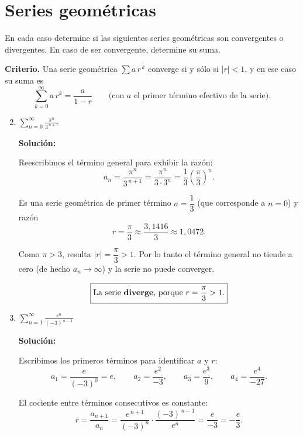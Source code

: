\documentclass[12pt]{article}
\newcommand{\solucion}{%
    \vspace{0.8em}%
    \textbf{Solución:}%
}
\begin{document}

\section{Series geométricas}

En cada caso determine si las siguientes series geométricas son convergentes o
divergentes. En caso de ser convergente, determine su suma.

\vspace{0.5em}
\textbf{Criterio.} Una serie geométrica $\sum a\,r^{\,k}$ converge si y sólo si
$|r|<1$, y en ese caso su suma es
\[
\sum_{k=0}^{\infty}a\,r^{k}=\frac{a}{1-r}
\qquad\text{(con $a$ el primer término efectivo de la serie).}
\]

\begin{enumerate}[label=\alph*.-]

    \setcounter{enumi}{1} %

    \item $\displaystyle\sum_{n=0}^{\infty}\frac{\pi^{n}}{3^{\,n+1}}$

    \solucion

    Reescribimos el término general para exhibir la razón:
    \[
    a_n=\frac{\pi^{n}}{3^{\,n+1}}
    =\frac{\pi^{n}}{3\cdot 3^{n}}
    =\frac13\left(\frac{\pi}{3}\right)^{n}.
    \]

    Es una serie geométrica de primer término $a=\dfrac13$ (que corresponde a
    $n=0$) y razón
    \[
    r=\frac{\pi}{3}\approx\frac{3{,}1416}{3}\approx 1{,}0472 .
    \]

    Como $\pi>3$, resulta $|r|=\dfrac{\pi}{3}>1$. Por lo tanto el término
    general no tiende a cero (de hecho $a_n\to\infty$) y la serie no puede
    converger.

    \[
    \boxed{
    \text{La serie \textbf{diverge}, porque }r=\frac{\pi}{3}>1 .
    }
    \]

    \item $\displaystyle\sum_{n=1}^{\infty}\frac{e^{n}}{(-3)^{\,n-1}}$

    \solucion

    Escribimos los primeros términos para identificar $a$ y $r$:
    \[
    a_1=\frac{e}{(-3)^{0}}=e,
    \qquad
    a_2=\frac{e^{2}}{-3},
    \qquad
    a_3=\frac{e^{3}}{9},
    \qquad
    a_4=\frac{e^{4}}{-27}.
    \]

    El cociente entre términos consecutivos es constante:
    \[
    r=\frac{a_{n+1}}{a_n}
    =\frac{e^{\,n+1}}{(-3)^{n}}\cdot\frac{(-3)^{\,n-1}}{e^{n}}
    =\frac{e}{-3}=-\frac{e}{3}.
    \]


\end{enumerate}
\end{document}

